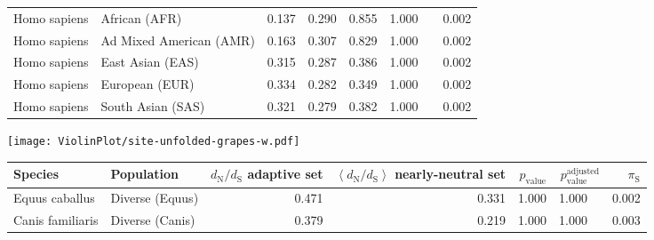 \begin{center}
\begin{adjustbox}{width = 1\textwidth}
\begin{tabular}{|l|l|r|r|r|r|r|}
        Homo sapiens &                   African (AFR) &                                              0.137 &                                              0.290 &                0.855 &                                  1.000~~ &              0.002 \\
        Homo sapiens &         Ad Mixed American (AMR) &                                              0.163 &                                              0.307 &                0.829 &                                  1.000~~ &              0.002 \\
        Homo sapiens &                East Asian (EAS) &                                              0.315 &                                              0.287 &                0.386 &                                  1.000~~ &              0.002 \\
        Homo sapiens &                  European (EUR) &                                              0.334 &                                              0.282 &                0.349 &                                  1.000~~ &              0.002 \\
        Homo sapiens &               South Asian (SAS) &                                              0.321 &                                              0.279 &                0.382 &                                  1.000~~ &              0.002 \\
\bottomrule
\end{tabular}
\end{adjustbox}
\newpage
\texttt{[image: ViolinPlot/site-unfolded-grapes-w.pdf]} 
\begin{adjustbox}{width = 1\textwidth}
\begin{tabular}{|l|l|r|r|r|r|r|}
\toprule
             Species &                      Population & \specialcell{$d_{\mathrm{N}} / d_{\mathrm{S}}$ \\ adaptive set} & \specialcell{$\left< d_{\mathrm{N}} / d_{\mathrm{S}} \right>$ \\ nearly-neutral set} & $p_{\mathrm{value}}$ & $p_{\mathrm{value}}^{\mathrm{adjusted}}$ & $\pi_{\textrm{S}}$ \\
\midrule
      Equus caballus &                 Diverse (Equus) &                                              0.471 &                                              0.331 &                1.000 &                                  1.000~~ &              0.002 \\
    Canis familiaris &                 Diverse (Canis) &                                              0.379 &                                              0.219 &                1.000 &                                  1.000~~ &              0.003 \\

\end{tabular}
\end{adjustbox}
\end{center}

